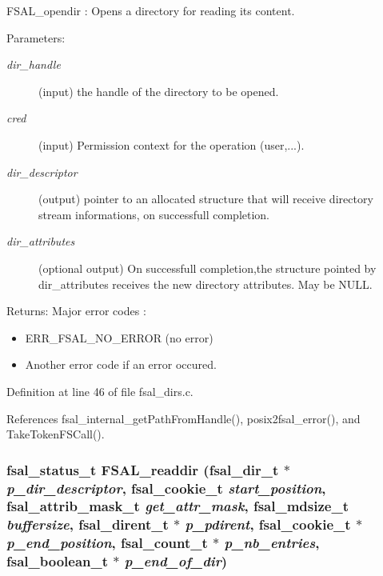 FSAL\_\-opendir : Opens a directory for reading its content.

\begin{Desc}
\item[Parameters:]
\begin{description}
\item[{\em dir\_\-handle}](input) the handle of the directory to be opened. \item[{\em cred}](input) Permission context for the operation (user,...). \item[{\em dir\_\-descriptor}](output) pointer to an allocated structure that will receive directory stream informations, on successfull completion. \item[{\em dir\_\-attributes}](optional output) On successfull completion,the structure pointed by dir\_\-attributes receives the new directory attributes. May be NULL.\end{description}
\end{Desc}
\begin{Desc}
\item[Returns:]Major error codes :\begin{itemize}
\item ERR\_\-FSAL\_\-NO\_\-ERROR (no error)\item Another error code if an error occured. \end{itemize}
\end{Desc}


Definition at line 46 of file fsal\_\-dirs.c.

References fsal\_\-internal\_\-getPathFromHandle(), posix2fsal\_\-error(), and TakeTokenFSCall().
\subsubsection[{FSAL\_\-readdir}]{\setlength{\rightskip}{0pt plus 5cm}fsal\_\-status\_\-t FSAL\_\-readdir (fsal\_\-dir\_\-t $\ast$ {\em p\_\-dir\_\-descriptor}, \/  fsal\_\-cookie\_\-t {\em start\_\-position}, \/  fsal\_\-attrib\_\-mask\_\-t {\em get\_\-attr\_\-mask}, \/  fsal\_\-mdsize\_\-t {\em buffersize}, \/  fsal\_\-dirent\_\-t $\ast$ {\em p\_\-pdirent}, \/  fsal\_\-cookie\_\-t $\ast$ {\em p\_\-end\_\-position}, \/  fsal\_\-count\_\-t $\ast$ {\em p\_\-nb\_\-entries}, \/  fsal\_\-boolean\_\-t $\ast$ {\em p\_\-end\_\-of\_\-dir})}\label{fsal__dirs_8c_b5ff624d5551dbf8ef1825ae44d5c2b9}


